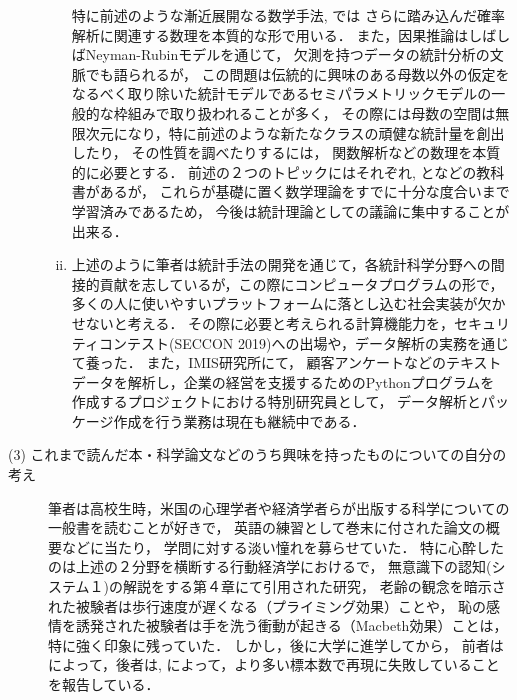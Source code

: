 \documentclass[uplatex, dvipdfmx]{jsarticle}
\begin{document}
\begin{description}
\begin{enumerate}[(i)]
        特に前述のような漸近展開なる数学手法\cite{Shigeo-Yoshida00-GeometricMixing}, \cite{Yoshida04-Partial-Mixing}では
        さらに踏み込んだ確率解析に関連する数理を本質的な形で用いる．
        また，因果推論はしばしばNeyman-Rubinモデルを通じて，
        欠測を持つデータの統計分析の文脈でも語られるが，
        この問題は伝統的に興味のある母数以外の仮定をなるべく取り除いた統計モデルであるセミパラメトリックモデルの一般的な枠組みで取り扱われることが多く\cite{Tsiatis06-Semiparametric}，
        その際には母数の空間は無限次元になり，特に前述のような新たなクラスの頑健な統計量を創出したり，
        その性質を調べたりするには，
        関数解析などの数理を本質的に必要とする．
        前述の２つのトピックにはそれぞれ\cite{Bhattacharya-LargeSampleTheory}, \cite{LeCam-Yang00-Asymptotics}と\cite{BKRW98-Semiparametric}などの教科書があるが，
        これらが基礎に置く数学理論をすでに十分な度合いまで学習済みであるため，
        今後は統計理論としての議論に集中することが出来る．\vspace{1em}
        \item 上述のように筆者は統計手法の開発を通じて，各統計科学分野への間接的貢献を志しているが，この際にコンピュータプログラムの形で，多くの人に使いやすいプラットフォームに落とし込む社会実装が欠かせないと考える．
        その際に必要と考えられる計算機能力を，セキュリティコンテスト(SECCON 2019)への出場や，データ解析の実務を通じて養った．
        また，IMIS研究所にて，
        顧客アンケートなどのテキストデータを解析し，企業の経営を支援するためのPythonプログラムを
        作成するプロジェクトにおける特別研究員として，
        データ解析とパッケージ作成を行う業務は現在も継続中である．
    \end{enumerate}\vspace{1em}
    \item[(3) これまで読んだ本・科学論文などのうち興味を持ったものについての自分の考え] 
    \mbox{}
    \vspace{1em}
    
    筆者は高校生時，米国の心理学者や経済学者らが出版する科学についての一般書を読むことが好きで，
    英語の練習として巻末に付された論文の概要などに当たり，
    学問に対する淡い憧れを募らせていた．
    特に心酔したのは上述の２分野を横断する行動経済学における\cite{DanielKahneman13-FastAndSlow}で，
    無意識下の認知(システム１)の解説をする第４章にて引用された研究，
    老齢の観念を暗示された被験者は歩行速度が遅くなる\cite{JohnBargh-Priming}（プライミング効果）ことや，
    恥の感情を誘発された被験者は手を洗う衝動が起きる\cite{06-LadyMacbeth}（Macbeth効果）ことは，
    特に強く印象に残っていた．
    しかし，後に大学に進学してから，
    前者は\cite{12-ANTIBehavioralPriming}によって，後者は\cite{11-AntiLadyMacbeth}, \cite{14-AntiLadyMacbeth}
    によって，より多い標本数で再現に失敗していることを報告している．

\end{description}
\end{document}
